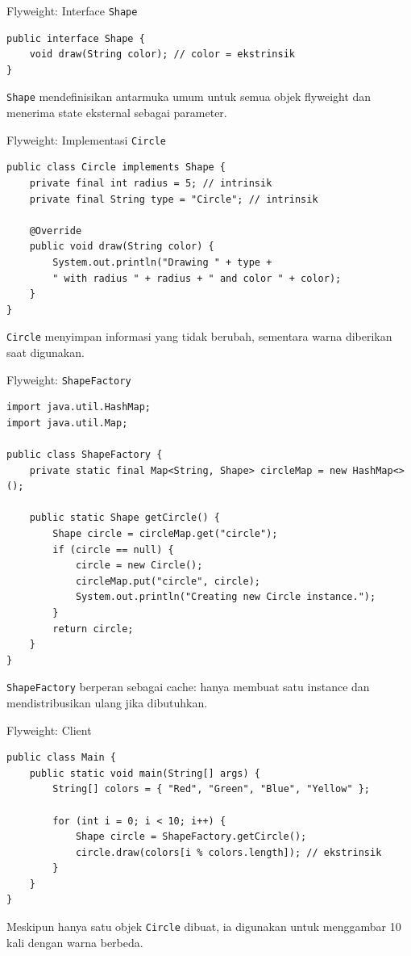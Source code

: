 \documentclass[aspectratio=169, table]{beamer}
\begin{document}
\begin{frame}[fragile]{Flyweight: Interface \texttt{Shape}}
\vspace{10pt}
\begin{lstlisting}[style=JavaStyle]
public interface Shape {
	void draw(String color); // color = ekstrinsik
}
\end{lstlisting}
\small \texttt{Shape} mendefinisikan antarmuka umum untuk semua objek flyweight dan menerima state eksternal sebagai parameter.
\end{frame}

\begin{frame}[fragile]{Flyweight: Implementasi \texttt{Circle}}
\vspace{10pt}
\begin{lstlisting}[style=JavaStyle]
public class Circle implements Shape {
	private final int radius = 5; // intrinsik
	private final String type = "Circle"; // intrinsik
	
	@Override
	public void draw(String color) {
		System.out.println("Drawing " + type + 
		" with radius " + radius + " and color " + color);
	}
}
\end{lstlisting}
\small \texttt{Circle} menyimpan informasi yang tidak berubah, sementara warna diberikan saat digunakan.
\end{frame}

\begin{frame}[fragile]{Flyweight: \texttt{ShapeFactory}}
\vspace{10pt}
\begin{lstlisting}[style=JavaStyle]
import java.util.HashMap;
import java.util.Map;

public class ShapeFactory {
	private static final Map<String, Shape> circleMap = new HashMap<>();
	
	public static Shape getCircle() {
		Shape circle = circleMap.get("circle");
		if (circle == null) {
			circle = new Circle();
			circleMap.put("circle", circle);
			System.out.println("Creating new Circle instance.");
		}
		return circle;
	}
}
\end{lstlisting}
\small \texttt{ShapeFactory} berperan sebagai cache: hanya membuat satu instance dan mendistribusikan ulang jika dibutuhkan.
\end{frame}

\begin{frame}[fragile]{Flyweight: Client}
\vspace{10pt}
\begin{lstlisting}[style=JavaStyle]
public class Main {
	public static void main(String[] args) {
		String[] colors = { "Red", "Green", "Blue", "Yellow" };
		
		for (int i = 0; i < 10; i++) {
			Shape circle = ShapeFactory.getCircle();
			circle.draw(colors[i % colors.length]); // ekstrinsik
		}
	}
}
\end{lstlisting}
\small Meskipun hanya satu objek \texttt{Circle} dibuat, ia digunakan untuk menggambar 10 kali dengan warna berbeda.
\end{frame}
\end{document}
